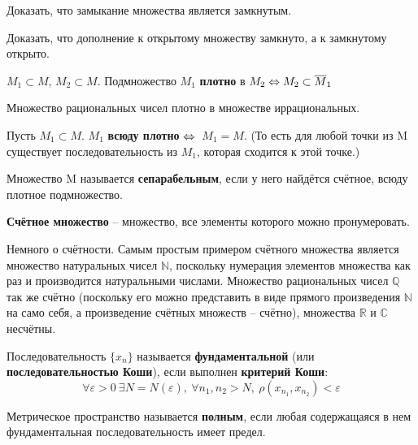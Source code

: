 	\exc Доказать, что замыкание множества является замкнутым.
	
	\exc Доказать, что дополнение к открытому множеству замкнуто, а к замкнутому открыто.
	
	\begin{defi}
		$M_1 \subset M$, $M_2 \subset M$. Подмножество $M_1$ \textbf{плотно} в $M_2 \Leftrightarrow M_2 \subset \overline{M}_1$
	\end{defi}
	
	\example Множество рациональных чисел плотно в множестве иррациональных.
	
	\begin{defi}
		Пусть $M_1 \subset M$. $M_1$ \textbf{всюду плотно} $\Leftrightarrow$ $\
		{M}_1 = M$. (То есть для любой точки из M существует 
		последовательность из $M_1$, которая сходится к этой точке.)
	\end{defi}
	
	\begin{defi}
		Множество M называется \textbf{сепарабельным}, если у него найдётся счётное, всюду плотное подмножество.
	\end{defi}
	
	\begin{defi}
		\textbf{Счётное множество} -- множество, все элементы которого можно пронумеровать.
	\end{defi}

	{\color{gray} Немного о счётности. Самым простым примером счётного множества является множество натуральных чисел $\mathbb{N}$, поскольку нумерация элементов множества как раз и производится натуральными числами. Множество рациональных чисел $\mathbb{Q}$ так же счётно (поскольку его можно представить в виде прямого произведения $\mathbb{N}$ на само себя, а произведение счётных множеств -- счётно), множества $\mathbb{R}$ и $\mathbb{C}$ несчётны.}
	
	\begin{defi}
		Последовательность $\{x_n\}$ называется \textbf{фундаментальной} (или \textbf{последовательностью Коши}), если выполнен 
		\textbf{критерий Коши}:
		$$\forall \varepsilon > 0 ~\exists N = N(\varepsilon),~ \forall n_1, n_2 > N,~ \rho(x_{n_1}, x_{n_2}) < \varepsilon$$
	\end{defi}

	\begin{defi}
		Метрическое пространство называется \textbf{полным}, если любая содержащаяся в нем фундаментальная последовательность имеет 
		предел.
	\end{defi}
	
